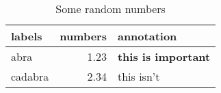 
\begin{table}[htbp]
    \centering
    \begin{tabular}{lrl}
    \toprule
    labels   & numbers & annotation \\
    \midrule
    abra     &  1.23   & \textbf{this is important}\\
    cadabra  &  2.34   & this isn't\\
    \bottomrule
    \end{tabular}
    \caption{Some random numbers}
    \label{tab:random}
\end{table}